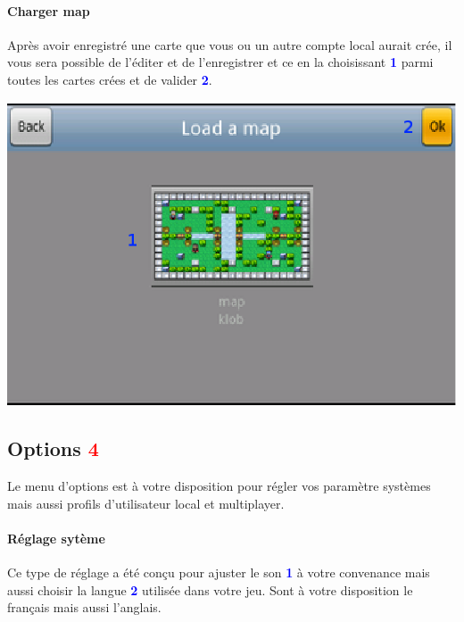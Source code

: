 	\paragraph{Charger map\\}
	Après avoir enregistré une carte que vous ou un autre compte local aurait crée,
	il vous sera possible de l'éditer et de l'enregistrer et ce en la choisissant
	\textcolor{blue}{\textbf{1}} parmi toutes les cartes crées et de valider
	\textcolor{blue}{\textbf{2}}. 
	
	\begin{center}
		\includegraphics[scale=0.7]{Manuel/Img/14.eps}
	\end{center}
	

\subsection{Options \textcolor{red}{4}}
	Le menu d'options est à votre disposition pour régler vos paramètre systèmes
	mais aussi profils d'utilisateur local et multiplayer.
	
	\paragraph{Réglage sytème\\}
	Ce type de réglage a été conçu pour ajuster le son
	\textcolor{blue}{\textbf{1}} à votre convenance mais aussi choisir la langue
	\textcolor{blue}{\textbf{2}} utilisée dans votre jeu. Sont à votre disposition
	le français mais aussi l'anglais.
	
